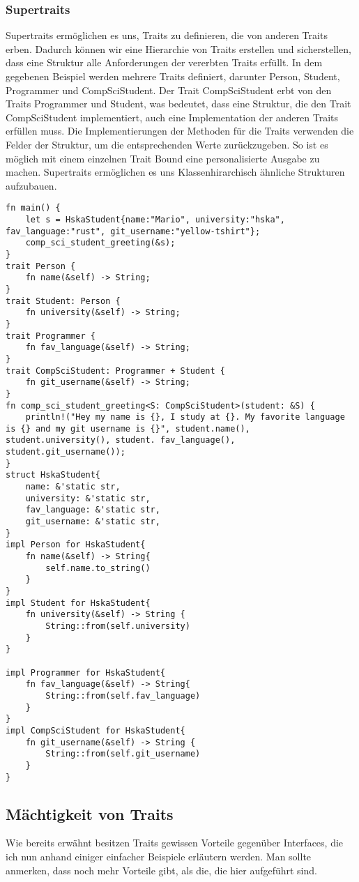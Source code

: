 \documentclass[a4paper, 1ppt]{article}
\begin{document}
\subsubsection{Supertraits}
Supertraits ermöglichen es uns, Traits zu definieren, die von anderen Traits erben. Dadurch können wir eine Hierarchie von Traits erstellen und sicherstellen, dass eine Struktur alle Anforderungen der vererbten Traits erfüllt.
In dem gegebenen Beispiel werden mehrere Traits definiert, darunter Person, Student, Programmer und CompSciStudent. Der Trait CompSciStudent erbt von den Traits Programmer und Student, was bedeutet, dass eine Struktur, die den Trait CompSciStudent implementiert, auch eine Implementation der anderen Traits erfüllen muss.
 Die Implementierungen der Methoden für die Traits verwenden die Felder der Struktur, um die entsprechenden Werte zurückzugeben.
So ist es möglich mit einem einzelnen Trait Bound eine personalisierte Ausgabe zu machen.
Supertraits ermöglichen es uns Klassenhirarchisch ähnliche Strukturen aufzubauen. 
\begin{verbatim}
fn main() {
    let s = HskaStudent{name:"Mario", university:"hska", fav_language:"rust", git_username:"yellow-tshirt"};
    comp_sci_student_greeting(&s);
}
trait Person {
    fn name(&self) -> String;
}
trait Student: Person {
    fn university(&self) -> String;
}
trait Programmer {
    fn fav_language(&self) -> String;
}
trait CompSciStudent: Programmer + Student {
    fn git_username(&self) -> String;
}
fn comp_sci_student_greeting<S: CompSciStudent>(student: &S) {
    println!("Hey my name is {}, I study at {}. My favorite language is {} and my git username is {}", student.name(), student.university(), student. fav_language(), student.git_username());
}
struct HskaStudent{
    name: &'static str,
    university: &'static str,
    fav_language: &'static str,
    git_username: &'static str,
}
impl Person for HskaStudent{
    fn name(&self) -> String{
        self.name.to_string()
    }
}
impl Student for HskaStudent{
    fn university(&self) -> String {
        String::from(self.university)
    }
}

impl Programmer for HskaStudent{
    fn fav_language(&self) -> String{
        String::from(self.fav_language)
    }
}
impl CompSciStudent for HskaStudent{
    fn git_username(&self) -> String {
        String::from(self.git_username)
    }
}
\end{verbatim}
\subsection{Mächtigkeit von Traits}
Wie bereits erwähnt besitzen Traits gewissen Vorteile gegenüber Interfaces, die ich nun anhand einiger einfacher Beispiele erläutern werden.
Man sollte anmerken, dass noch mehr Vorteile gibt, als die, die hier aufgeführt sind.
\end{document}
